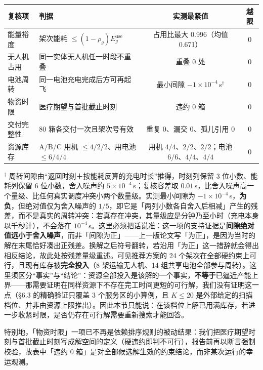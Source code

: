\begin{center}
\begin{minipage}{\textwidth}
	\label{tab:hardcheck}
	\centering
	\begin{tabularx}{0.98\textwidth}{lXcc}
		\toprule
		复核项 & 判据 & 实测最紧值 & 越限 \\
		\midrule
		能量裕度 & 架次能耗 $\le (1-\rho_g)E_g^{\mathrm{use}}$ & 占用比最大 0.996（均值 0.671） & 0 \\
		无人机占用 & 同一实体无人机任一时段不重叠 & 重叠 0 处 & 0 \\
		电池周转 & 同一电池充电完成后方可再起飞 & 最小间隙 $-1\times10^{-4}$\,s$^{\dagger}$ & 0 \\
		物资时限 & 医疗期望与首批截止时刻 & 违约 0 箱 & 0 \\
		交付完整性 & 80 箱各交付一次且架次号有效 & 重复 0、漏交 0、孤儿引用 0 & 0 \\
		资源库存 & A/B/C 用机 $\le 4/2/2$、用电池 $\le 6/4/4$ & 用机 $4/4$、$2/2$、$2/2$；电池 $6/6$、$4/4$、$4/4$ & 0 \\
		\bottomrule
	\end{tabularx}
\end{minipage}
\end{center}

$^{\dagger}$ 周转间隙由“返回时刻＋按能耗反算的充电时长”推得，时刻列保留 3 位小数、能耗列保留 6 位小数，舍入噪声约 $5\times10^{-4}$\,s；复核容差取 $0.01$\,s，比舍入噪声高一个量级、比任何真实调度冲突小两个数量级。实测最小间隙为 $-1\times10^{-4}$\,s，\textbf{为负}，但绝对值仅为舍入噪声的 $1/5$，即它是「两列小数各自舍入后相减」产生的残差，而不是真实的周转冲突：若真存在冲突，其量级应是分钟乃至小时（充电本身以千秒计），不会落在 $10^{-4}$\,s。这里必须把话说准：这一项的支持证据是\textbf{间隙绝对值远小于舍入噪声}，而非「间隙为正」——上一版论文写「为正」，是因为当时的解在末尾恰好凑出正残差。换解之后符号翻转，若沿用「为正」这一措辞就会得出相反结论，故此处按残差量级重述。可见推荐方案的 24 个架次在全部硬约束上可行，且现有库存被\textbf{完全投入}（8 架运输无人机、14 组共享电池全部参与周转）。这里须区分“事实”与“结论”：资源全部投入是该解的一个事实，\textbf{不等于}已逼近产能上界——那需要证明在同样资源下不存在完工时间更短的可行解，我们没有证明这一点（§6.3 的精确验证只覆盖 3 个服务区的小算例，且 $K\le20$ 是外部给定的扫描档位、并非由资源上限推出）。因此本节只能说：在该档位上解已用满库存，若进一步收紧时限，是否仍存在可行解需要重新搜索才能回答。

特别地，「物资时限」一项已不再是依赖排序规则的被动结果：我们把医疗期望时刻与首批截止时刻写成解空间的定义（硬违约即判不可行），报告前再以断言强制校验，故表中「违约 0 箱」是对全部候选解生效的约束结论，而非某次运行的幸运观测。

